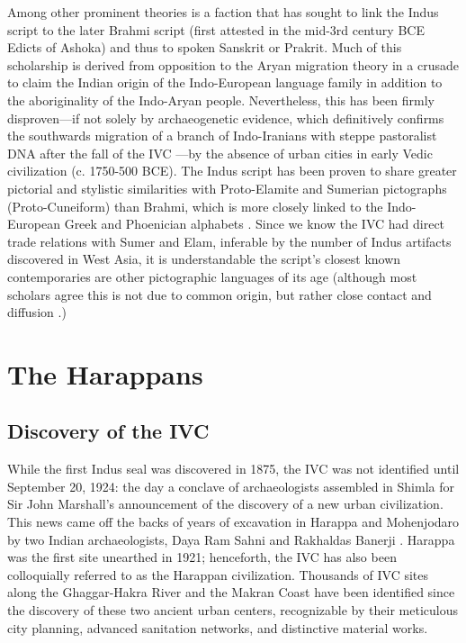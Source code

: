 \documentclass[11pt,a4paper,oneside]{report}
\begin{document}
Among other prominent theories is a faction that has sought to link the Indus script to the later Brahmi script (first attested in the mid-3rd century BCE Edicts of Ashoka) and thus to spoken Sanskrit or Prakrit. Much of this scholarship is derived from opposition to the Aryan migration theory in a crusade to claim the Indian origin of the Indo-European language family in addition to the aboriginality of the Indo-Aryan people. Nevertheless, this has been firmly disproven—if not solely by archaeogenetic evidence, which definitively confirms the southwards migration of a branch of Indo-Iranians with steppe pastoralist DNA after the fall of the IVC \cite{reich_reconstructing_2009, narasimhan_formation_2019}—by the absence of urban cities in early Vedic civilization (c. 1750-500 BCE). The Indus script has been proven to share greater pictorial and stylistic similarities with Proto-Elamite and Sumerian pictographs (Proto-Cuneiform) than Brahmi, which is more closely linked to the Indo-European Greek and Phoenician alphabets \cite{daggumati_convolutional_2023, daggumati_data_2018, daggumati_data_2019}. Since we know the IVC had direct trade relations with Sumer and Elam, inferable by the number of Indus artifacts discovered in West Asia, it is understandable the script's closest known contemporaries are other pictographic languages of its age (although most scholars agree this is not due to common origin, but rather close contact and diffusion \cite{zvelebil_dravidian_1997}.)

\section{The Harappans}
\subsection{Discovery of the IVC}
\noindent\hspace{1cm}
While the first Indus seal was discovered in 1875, the IVC was not identified until September 20, 1924: the day a conclave of archaeologists assembled in Shimla for Sir John Marshall's announcement of the discovery of a new urban civilization. This news came off the backs of years of excavation in Harappa and Mohenjodaro by two Indian archaeologists, Daya Ram Sahni and Rakhaldas Banerji \cite{lahiri_finding_2013, lahiri_are_2017}. Harappa was the first site unearthed in 1921; henceforth, the IVC has also been colloquially referred to as the Harappan civilization. Thousands of IVC sites along the Ghaggar-Hakra River and the Makran Coast have been identified since the discovery of these two ancient urban centers, recognizable by their meticulous city planning, advanced sanitation networks, and distinctive material works.
\end{document}
